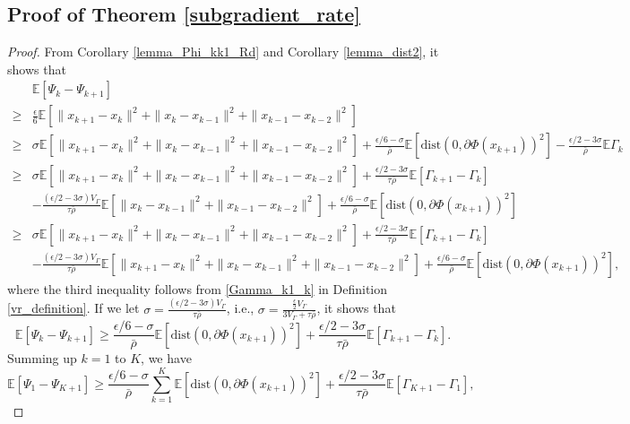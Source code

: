 \documentclass[letterpaper]{article} %
\begin{document}
	\subsection{Proof of Theorem \ref{subgradient_rate}}
	\begin{proof}
		From Corollary \ref{lemma_Phi_kk1_Rd} and Corollary \ref{lemma_dist2}, it shows that
		\begin{align*}
			&\mathbb{E}[\Psi_{k}-\Psi_{k+1}]\\
			\ge&\frac{\epsilon}{6}\mathbb{E}[\|x_{k+1}-x_{k}\|^{2}+\|x_{k}-x_{k-1}\|^{2}+\|x_{k-1}-x_{k-2}\|^{2}]\\
			\ge&\sigma\mathbb{E}[\|x_{k+1}-x_{k}\|^{2}+\|x_{k}-x_{k-1}\|^{2}+\|x_{k-1}-x_{k-2}\|^{2}]
			+\frac{\epsilon/6-\sigma}{\bar{\rho}}\mathbb{E}[\mathrm{dist}(0,\partial\Phi(x_{k+1}))^{2}]-\frac{\epsilon/2-3\sigma}{\bar{\rho}}\mathbb{E}\Gamma_{k}\\
			\ge&\sigma\mathbb{E}[\|x_{k+1}-x_{k}\|^{2}+\|x_{k}-x_{k-1}\|^{2}+\|x_{k-1}-x_{k-2}\|^{2}]+\frac{\epsilon/2-3\sigma}{\tau\bar{\rho}}\mathbb{E}[\Gamma_{k+1}-\Gamma_{k}]\\
			&-\frac{(\epsilon/2-3\sigma)V_{\Gamma}}{\tau\bar{\rho}}\mathbb{E}[\|x_{k}-x_{k-1}\|^{2}+\|x_{k-1}-x_{k-2}\|^{2}]
			+\frac{\epsilon/6-\sigma}{\bar{\rho}}\mathbb{E}[\mathrm{dist}(0,\partial\Phi(x_{k+1}))^{2}]\\
			\ge&\sigma\mathbb{E}[\|x_{k+1}-x_{k}\|^{2}+\|x_{k}-x_{k-1}\|^{2}+\|x_{k-1}-x_{k-2}\|^{2}]
			+\frac{\epsilon/2-3\sigma}{\tau\bar{\rho}}\mathbb{E}[\Gamma_{k+1}-\Gamma_{k}]\\
			& -\frac{(\epsilon/2-3\sigma)V_{\Gamma}}{\tau\bar{\rho}}\mathbb{E}[\|x_{k+1}-x_{k}\|^{2}+\|x_{k}-x_{k-1}\|^{2}+\|x_{k-1}-x_{k-2}\|^{2}]
			+\frac{\epsilon/6-\sigma}{\bar{\rho}}\mathbb{E}[\mathrm{dist}(0,\partial\Phi(x_{k+1}))^{2}],
		\end{align*}
		where the third inequality follows from \eqref{Gamma_k1_k} in Definition \ref{vr_definition}. If we let $\sigma=\frac{(\epsilon/2-3\sigma)V_{\Gamma}}{\tau\bar{\rho}}$, i.e., $\sigma=\frac{\frac{\epsilon}{2}V_{\Gamma}}{3V_{\Gamma}+\tau\bar{\rho}}$, it shows that
		\[
		\mathbb{E}[\Psi_{k}-\Psi_{k+1}]\ge \frac{\epsilon/6-\sigma}{\bar{\rho}}\mathbb{E}[\mathrm{dist}(0,\partial\Phi(x_{k+1}))^{2}]+\frac{\epsilon/2-3\sigma}{\tau\bar{\rho}}\mathbb{E}[\Gamma_{k+1}-\Gamma_{k}].
		\]
		Summing up $k=1$ to $K$, we have
		\[
		\mathbb{E}[\Psi_{1}-\Psi_{K+1}]\ge \frac{\epsilon/6-\sigma}{\bar{\rho}}\sum_{k=1}^{K}\mathbb{E}[\mathrm{dist}(0,\partial\Phi(x_{k+1}))^{2}]+\frac{\epsilon/2-3\sigma}{\tau\bar{\rho}}\mathbb{E}[\Gamma_{K+1}-\Gamma_{1}],
\]
\end{proof}
\end{document}
